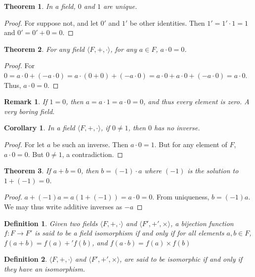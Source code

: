 \documentclass[12pt,oneside]{book}
\theoremstyle{mystyle}
\newtheorem{theorem}{Theorem}[section]
\newtheorem{definition}{Definition}[section]
\newtheorem{corollary}{Corollary}[section]
\newtheorem{remark}{Remark}[section]
\begin{document}
\begin{theorem}
In a field, $0$ and $1$ are unique.
\end{theorem}
\begin{proof}
For suppose not, and let $0'$ and $1'$ be other identities. Then $1'=1'\cdot 1 = 1$ and $0'=0'+0=0$.
\end{proof}

\begin{theorem}
For any field $\langle F,+,\cdot \rangle$, for any $a\in F$, $a\cdot 0 = 0$.
\end{theorem}
\begin{proof}
For $0 = a\cdot 0 + (-a\cdot 0) = a\cdot(0+0) +(-a\cdot 0) = a\cdot 0 + a\cdot 0 + (-a\cdot 0) = a\cdot 0$. Thus, $a\cdot 0 = 0$.
\end{proof}

\begin{remark}
If $1=0$, then $a=a\cdot 1 = a\cdot 0 = 0$, and thus every element is zero. A very boring field.
\end{remark}

\begin{corollary}
In a field $\langle F, +,\cdot \rangle$, if $0\ne 1$, then $0$ has no inverse.
\end{corollary}
\begin{proof}
For let $a$ be such an inverse. Then $a\cdot 0 = 1$. But for any element of $F$, $a \cdot 0 = 0$. But $0\ne 1$, a contradiction.
\end{proof}

\begin{theorem}
If $a+b = 0$, then $b= (-1)\cdot a$ where $(-1)$ is the solution to $1+(-1)=0$.
\end{theorem}
\begin{proof}
$a+(-1)a = a(1+(-1)) = a\cdot 0 = 0$. From uniqueness, $b=(-1)a$. We may thus write additive inverses as $-a$
\end{proof}

\begin{definition}
Given two fields $\langle F,+,\cdot \rangle$ and $\langle F', +',\times \rangle$, a bijection function $f:F\rightarrow F'$ is said to be a field isomorphism if and only if for all elements $a,b\in F$, $f(a+b)=f(a)+'f(b)$, and $f(a\cdot b) = f(a)\times f(b)$
\end{definition}

\begin{definition}
$\langle F,+,\cdot \rangle$ and $\langle F', +',\times \rangle$, are said to be isomorphic if and only if they have an isomorphism.
\end{definition}
\end{document}
